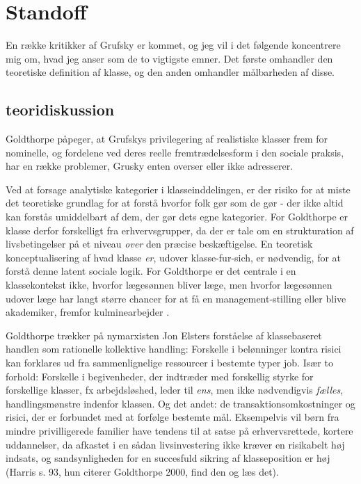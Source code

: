 \section{Standoff \label{2_klassestandoff}}

En række kritikker af Grufsky er kommet, og jeg vil i det følgende koncentrere mig om, hvad jeg anser som de to vigtigste emner. Det første omhandler den teoretiske definition af klasse, og den anden omhandler målbarheden af disse.


\subsection{teoridiskussion \label{2_kritikafgruskyteori}}

Goldthorpe påpeger, at Grufskys privilegering af realistiske klasser frem for nominelle, og fordelene ved deres reelle fremtrædelsesform i den sociale praksis, har en række problemer, Grusky enten overser eller ikke adresserer. 

Ved at forsage analytiske kategorier i klasseinddelingen, er der risiko for at miste det teoretiske grundlag for at forstå hvorfor folk gør som de gør - der ikke altid kan forstås umiddelbart af dem, der gør dets egne kategorier. For Goldthorpe er klasse derfor forskelligt fra erhvervsgrupper, da der er tale om en strukturation af livsbetingelser på et niveau \emph{over} den præcise beskæftigelse. En teoretisk konceptualisering af hvad klasse \emph{er}, udover klasse-fur-sich, er nødvendig, for at forstå denne latent sociale logik. For Goldthorpe er det centrale i en klassekontekst ikke, hvorfor lægesønnen bliver læge, men hvorfor lægesønnen udover læge har langt større chancer for at få en management-stilling eller blive akademiker, fremfor kulminearbejder \parencite[214]{Goldthorpe2002}. 

Goldthorpe trækker på nymarxisten Jon Elsters forståelse af klassebaseret handlen som rationelle kollektive handling: Forskelle i belønninger kontra risici kan forklares ud fra sammenlignelige ressourcer i bestemte typer job. Især to forhold: Forskelle i begivenheder, der indtræder med forskellig styrke for forskellige klasser, fx arbejdsløshed, leder til \emph{ens}, men ikke nødvendigvis \emph{fælles}, handlingsmønstre indenfor klassen. Og det andet: de transaktionsomkostninger og risici, der er forbundet med at forfølge bestemte mål. Eksempelvis vil børn fra mindre privilligerede familier have tendens til at satse på erhvervsrettede, kortere uddannelser, da afkastet i en sådan livsinvestering ikke kræver en risikabelt høj indsats, og sandsynligheden for en succesfuld sikring af klasseposition er høj (Harris s. 93, hun citerer Goldthorpe 2000, find den og læs det). 

